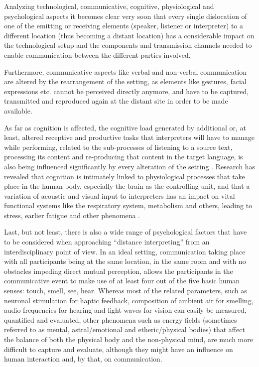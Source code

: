 \documentclass[output=paper]{langsci/langscibook}
\begin{document}
Analyzing technological, communicative, cognitive, physiological and psychological aspects it becomes clear very soon that every single dislocation of one of the emitting or receiving elements (speaker, listener or interpreter) to a different location (thus becoming a distant location) has a considerable impact on the technological setup and the components and transmission channels needed to enable communication between the different parties involved. 

Furthermore, communicative aspects like verbal and non-verbal communication are altered by the rearrangement of the setting, as elements like gestures, facial expressions etc. cannot be perceived directly anymore, and have to be captured, transmitted and reproduced again at the distant site in order to be made available.

As far as cognition is affected, the cognitive load generated by additional or, at least, altered receptive and productive tasks that interpreters will have to manage while performing, related to the sub-processes of listening to a source text, processing its content and re-producing that content in the target language, is also being influenced significantly by every alteration of the setting \citep{Moser-Mercer2005}. Research has revealed that cognition is intimately linked to physiological processes that take place in the human body, especially the brain as the controlling unit, and that a variation of acoustic and visual input to interpreters has an impact on vital functional systems like the respiratory system, metabolism and others, leading to stress, earlier fatigue and other phenomena \citep{Moser-Mercer2003}.

Last, but not least, there is also a wide range of psychological factors that have to be considered when approaching ``distance interpreting'' from an interdisciplinary point of view. In an ideal setting, communication taking place with all participants being at the same location, in the same room and with no obstacles impeding direct mutual perception, allows the participants in the communicative event to make use of at least four out of the five basic human senses: touch, smell, see, hear. Whereas most of the related parameters, such as neuronal stimulation for haptic feedback, composition of ambient air for smelling, audio frequencies for hearing and light waves for vision can easily be measured, quantified and evaluated, other phenomena such as energy fields (sometimes referred to as mental, astral/emotional and etheric/physical bodies) that affect the balance of both the physical body and the non-physical mind, are much more difficult to capture and evaluate, although they might have an influence on human interaction and, by that, on communication.
\end{document}
